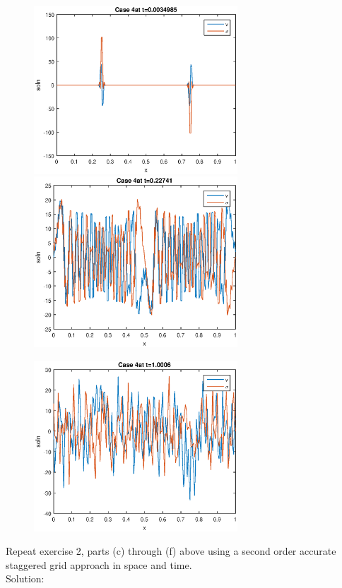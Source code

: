 \begin{figure}[h]
\centering
\includegraphics[width=3in]{initCol4}
\includegraphics[width=3in]{midCol4}
\end{figure}
\begin{figure}[h]
\centering
\includegraphics[width=3in]{endCol4}
\end{figure}
\eenum
\pagebreak
\item Repeat exercise 2, parts (c) through (f) above using a second order accurate staggered grid approach in space and time.\\ 
Solution:\\

